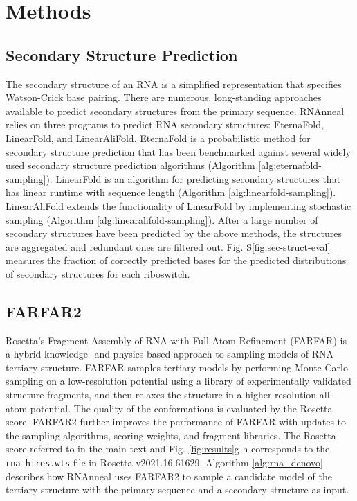 \documentclass[%
aip,
 amsmath,amssymb,
reprint,%
onecolumn,
]{revtex4-1}
\makeatletter
\newcommand\setcurrentname[1]{\def\@currentlabelname{#1}}
\makeatother
\begin{document}
{\section*{Methods}

\subsection*{Secondary Structure Prediction}
\setcurrentname{Secondary Structure Prediction}
\label{methods:sec-struct}
The secondary structure of an RNA is a simplified representation that specifies Watson-Crick base pairing. There are numerous, long-standing approaches available to predict secondary structures from the primary sequence.\cite{sato2023recent} RNAnneal relies on three programs to predict RNA secondary structures: EternaFold\cite{wayment2022rna}, LinearFold\cite{huang2019linearfold}, and LinearAliFold\cite{huang2019linearfold}. EternaFold is a probabilistic method for secondary structure prediction that
has been benchmarked against several widely used secondary structure prediction algorithms (Algorithm \ref{alg:eternafold-sampling}). LinearFold is an algorithm for predicting secondary structures that has linear runtime with sequence length (Algorithm \ref{alg:linearfold-sampling}). LinearAliFold extends the functionality of LinearFold by implementing stochastic sampling (Algorithm \ref{alg:linearalifold-sampling}). After a large number of secondary structures have been predicted by the above methods, the structures are aggregated and redundant ones are filtered out.  Fig. S\ref{fig:sec-struct-eval} measures the fraction of correctly predicted bases for the predicted distributions of secondary structures for each riboswitch. 

\subsection*{FARFAR2}
\setcurrentname{FARFAR2}
\label{methods:tertiary-struct}

Rosetta's Fragment Assembly of RNA with Full-Atom Refinement (FARFAR) is a hybrid knowledge- and physics-based approach to sampling models of RNA tertiary structure.\cite{das2010atomic} FARFAR samples tertiary models by performing Monte Carlo sampling on a low-resolution potential using a library of experimentally validated structure fragments, and then relaxes the structure in a higher-resolution all-atom potential. The quality of the conformations is evaluated by the Rosetta score. FARFAR2 further improves the performance of FARFAR with updates to the sampling algorithms, scoring weights, and fragment libraries.\cite{watkins2020farfar2} The Rosetta score referred to in the main text and Fig. \ref{fig:results}g-h corresponds to the \texttt{rna\_hires.wts} file in Rosetta v2021.16.61629. Algorithm \ref{alg:rna_denovo} describes how RNAnneal uses FARFAR2 to sample a candidate model of the tertiary structure with the primary sequence and a secondary structure as input.

}
\end{document}
